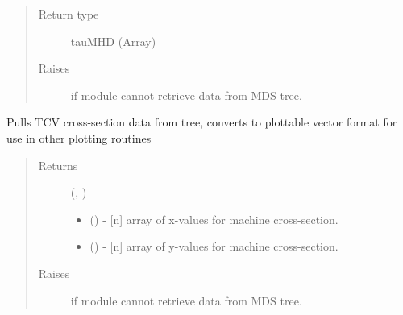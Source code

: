 \documentclass[letterpaper,10pt,english]{sphinxmanual}
\begin{document}
\begin{fulllineitems}
\begin{fulllineitems}
\begin{quote}
\begin{description}
\item[{Return type}] \leavevmode
tauMHD (Array)

\item[{Raises}] \leavevmode
{} \textendash{} if module cannot retrieve data from MDS tree.

\end{description}\end{quote}

\end{fulllineitems}


\begin{fulllineitems}
\label{\detokenize{eqtools:eqtools.TCVLIUQE.TCVLIUQETree.getMachineCrossSection}}
Pulls TCV cross-section data from tree, converts to plottable
vector format for use in other plotting routines
\begin{quote}\begin{description}
\item[{Returns}] \leavevmode

(, )
\begin{itemize}
\item {} 
 () - {[}n{]} array of x-values for machine cross-section.

\item {} 
 () - {[}n{]} array of y-values for machine cross-section.

\end{itemize}


\item[{Raises}] \leavevmode
{} \textendash{} if module cannot retrieve data from MDS tree.

\end{description}\end{quote}

\end{fulllineitems}



\end{fulllineitems}
\end{document}
